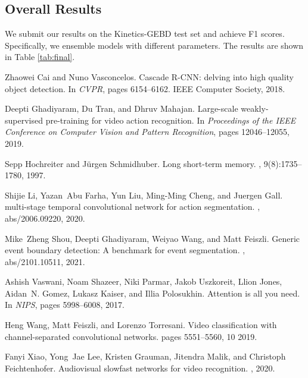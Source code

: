 \documentclass[final]{cvpr}
\begin{document}
\subsection{Overall Results}
We submit our results on the Kinetics-GEBD test set and achieve  F1 scores. Specifically, we ensemble  models with different parameters. The results are shown in Table \ref{tab:final}. 







{\small

\begin{thebibliography}{1}\itemsep=-1pt

Zhaowei Cai and Nuno Vasconcelos.
\newblock Cascade {R-CNN:} delving into high quality object detection.
\newblock In {\em CVPR}, pages 6154--6162. {IEEE} Computer Society, 2018.

Deepti Ghadiyaram, Du Tran, and Dhruv Mahajan.
\newblock Large-scale weakly-supervised pre-training for video action
  recognition.
\newblock In {\em Proceedings of the IEEE Conference on Computer Vision and
  Pattern Recognition}, pages 12046--12055, 2019.

Sepp Hochreiter and J{\"{u}}rgen Schmidhuber.
\newblock Long short-term memory.
, 9(8):1735--1780, 1997.

Shijie Li, Yazan~Abu Farha, Yun Liu, Ming{-}Ming Cheng, and Juergen Gall.
 multi-stage temporal convolutional network for action
  segmentation.
, abs/2006.09220, 2020.

Mike~Zheng Shou, Deepti Ghadiyaram, Weiyao Wang, and Matt Feiszli.
\newblock Generic event boundary detection: {A} benchmark for event
  segmentation.
, abs/2101.10511, 2021.

Ashish Vaswani, Noam Shazeer, Niki Parmar, Jakob Uszkoreit, Llion Jones,
  Aidan~N. Gomez, Lukasz Kaiser, and Illia Polosukhin.
\newblock Attention is all you need.
\newblock In {\em NIPS}, pages 5998--6008, 2017.

Heng Wang, Matt Feiszli, and Lorenzo Torresani.
\newblock Video classification with channel-separated convolutional networks.
\newblock pages 5551--5560, 10 2019.

Fanyi Xiao, Yong~Jae Lee, Kristen Grauman, Jitendra Malik, and Christoph
  Feichtenhofer.
\newblock Audiovisual slowfast networks for video recognition.
, 2020.

\end{thebibliography}
 }
\end{document}

